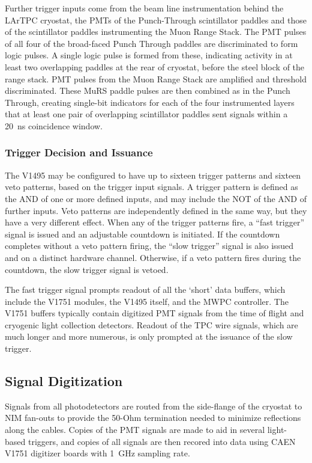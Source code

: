 Further trigger inputs come from the beam line instrumentation behind the LArTPC cryostat, the PMTs of the Punch-Through scintillator paddles and those of the scintillator paddles instrumenting the Muon Range Stack.  The PMT pulses of all four of the broad-faced Punch Through paddles are discriminated to form logic pulses.  A single logic pulse is formed from these, indicating activity in at least two overlapping paddles at the rear of cryostat, before the steel block of the range stack.  PMT pulses from the Muon Range Stack are amplified and threshold discriminated.  These MuRS paddle pulses are then combined as in the Punch Through, creating single-bit indicators for each of the four instrumented layers that at least one pair of overlapping scintillator paddles sent signals within a 20~ns coincidence window.

\subsubsection{Trigger Decision and Issuance}

The V1495 may be configured to have up to sixteen trigger patterns and sixteen veto patterns, based on the trigger input signals.  A trigger pattern is defined as the AND of one or more defined inputs, and may include the NOT of the AND of further inputs.  Veto patterns are independently defined in the same way, but they have a very different effect.  When any of the trigger patterns fire, a ``fast trigger'' signal is issued and an adjustable countdown is initiated.  If the countdown completes without a veto pattern firing, the ``slow trigger'' signal is also issued and on a distinct hardware channel. Otherwise, if a veto pattern fires during the countdown, the slow trigger signal is vetoed.  

The fast trigger signal prompts readout of all the `short' data buffers, which include the V1751 modules, the V1495 itself, and the MWPC controller.  The V1751 buffers typically contain digitized PMT signals from the time of flight and cryogenic light collection detectors. Readout of the TPC wire signals, which are much longer and more numerous, is only prompted at the issuance of the slow trigger.


\subsection*{Signal Digitization}

Signals from all photodetectors are routed from the side-flange of the cryostat to NIM fan-outs to provide the 50-Ohm termination needed to minimize reflections along the cables. Copies of the PMT signals are made to aid in several light-based triggers, and copies of all signals are then recored into data using CAEN V1751 digitizer boards with 1~GHz sampling rate.

